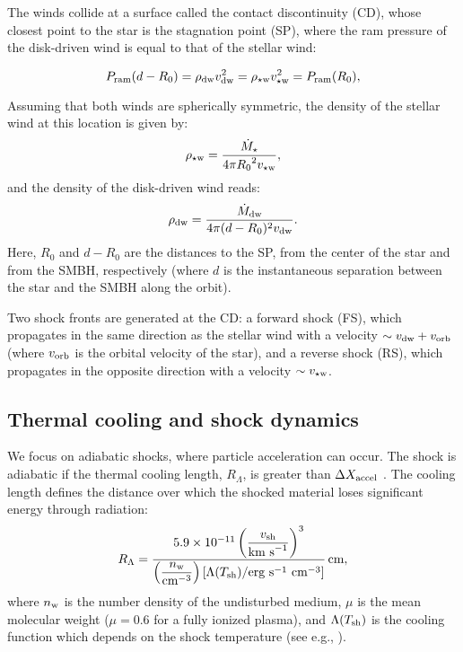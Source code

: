 \documentclass[baaa]{baaa}
\begin{document}
The winds collide at a surface called the contact discontinuity (CD), whose closest point to the star is the stagnation point (SP), where the ram pressure of the disk-driven wind is equal to that of the stellar wind:

\begin{equation}
P_{\text{\rm ram}}(d-R_0) = \rho_{\text{\rm dw}} v_{\text{\rm dw}}^2 = \rho_{\star \rm w} v_{\star \rm w}^2 = P_{\text{\rm ram}}(R_0),
\end{equation}

Assuming that both winds are spherically symmetric, the density of the stellar wind at this location is given by:
\begin{equation}
\rho_{\star \rm w} = \frac{\dot{M}_{\rm \star }}{4 \pi {R_0}^2 v_{\rm \star w}},
\end{equation}
and the density of the disk-driven wind reads:
\begin{equation}
\rho_{\rm dw} = \frac{\dot{M}_{\rm dw}}{4 \pi (d - R_0)^2 v_{\rm dw}}.
\end{equation}
Here, $R_0$ and $d - R_0$ are the distances to the SP, from the center of the star and from the SMBH, respectively (where $d$ is the instantaneous separation between the star and the SMBH along the orbit). 





Two shock fronts are generated at the CD: a forward shock (FS), which propagates in the same direction as the stellar wind with a velocity \(\sim v_{\text{\rm dw}} + v_{\text{\rm orb}}\) (where $v_{\text{\rm orb}}$ is the orbital velocity of the star), and a reverse shock (RS), which propagates in the opposite direction with a velocity $\sim v_{\star \rm w}$. 

\subsection{Thermal cooling and shock dynamics}


We focus on adiabatic shocks, where particle acceleration can occur. The shock is adiabatic if the thermal cooling length, $R_{\Lambda}$, is greater than $\Delta X_{\text{\rm accel}}$ \citep{1979ARA&A..17..213M}.
The cooling length defines the distance over which the shocked material loses significant energy through radiation: 
\begin{equation}
R_{\Lambda} = \dfrac{5.9 \times 10^{-11} \left(\dfrac{v_{\text{\rm sh}}}{\text{km s}^{-1}}\right)^{3}}{\left(\dfrac{n_{\rm w}}{\text{cm}^{-3}}\right) \left[\Lambda(T_{\text{\rm sh}})/\text{erg s}^{-1} \text{ cm}^{-3}\right]} \, \text{cm},
\end{equation}
\noindent where $n_{\rm w}$ is the number density of the undisturbed medium, $ \mu $ is the mean molecular weight ($ \mu = 0.6 $ for a fully ionized plasma), and $ \Lambda(T_{\text{\rm sh}}) $ is the cooling function which depends on the shock temperature (see e.g., \citealt{1976ApJ...204..290R,1998MNRAS.298.1021M,2003ApJ...587..278W}). 
\end{document}
